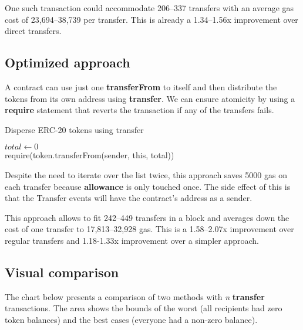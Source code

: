 \documentclass[12pt]{article}
\begin{document}
One such transaction could accommodate 206--337 transfers with an average gas cost of 23,694--38,739 per transfer. 
This is already a 1.34--1.56x improvement over direct transfers.

\subsection{Optimized approach}

A contract can use just one \textbf{transferFrom} to itself and then distribute the tokens from its own address using \textbf{transfer}. We can ensure atomicity by using a \textbf{require} statement that reverts the transaction if any of the transfers fails.

\begin{algorithm}[h]
	\label{optimized}
	\caption{Disperse ERC-20 tokens using transfer}
	\BlankLine
	$total \leftarrow 0$ \\
	\For{$i \in [0 \dots recipients.length)$}{
		$total \leftarrow total + values[i]$
	}
	require(token.transferFrom(sender, this, total)) \\
	\For{$i \in [0 \dots recipients.length)$}{
		require(token.transfer(this, recipients[i], values[i]))
	}
\end{algorithm}

Despite the need to iterate over the list twice, this approach saves 5000 gas on each transfer because \textbf{allowance} is only touched once.
The side effect of this is that the Transfer events will have the contract's address as a sender.

This approach allows to fit 242--449 transfers in a block and averages down the cost of one transfer to 17,813--32,928 gas.
This is a 1.58--2.07x improvement over regular transfers and 1.18-1.33x improvement over a simpler approach.

\subsection{Visual comparison}

The chart below presents a comparison of two methods with \textit{n} \textbf{transfer} transactions.
The area shows the bounds of the worst (all recipients had zero token balances) and the best cases (everyone had a non-zero balance).
\end{document}
